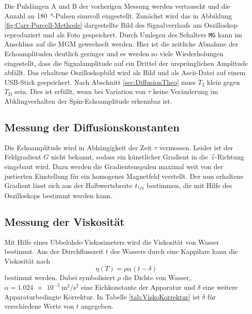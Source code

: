 Die Pulslängen A und B der vorherigen Messung werden vertauscht und die Anzahl an
\SI{180}{\degree}-Pulsen sinnvoll eingestellt.
Zunächst wird das in Abbildung \ref{fig:Carr-Purcell-Methode} dargestellte
Bild des Signalverrlaufs am Oszilloskop reproduziert und als Foto gespeichert.
Durch Umlegen des Schalters \texttt{MG} kann im Anschluss auf die MGM gewechselt werden.
Hier ist die zeitliche Abnahme der Echoamplituden deutlich geringer und es
werden so viele Wiederholungen eingestellt, dass die Signalamplitude auf ein Drittel
der ursprünglichen Amplitude abfällt.
Das erhaltene Oszilloskopbild wird als Bild und als Ascii-Datei auf einem USB-Stick
gespeichert.
Nach Abschnitt \ref{sec:DiffusionTheo} muss $T_2$ klein gegen $T_\text{D}$ sein.
Dies ist erfüllt, wenn bei Variation von $\tau$ keine Veränderung im Abklingverhalten
der Spin-Echoamplitude erkennbar ist.


\subsection{Messung der Diffusionskonstanten}
\label{sec:DurchDiffusion}

Die Echoamplitude wird in Abhängigkeit der Zeit $\tau$ vermessen.
Leider ist der Feldgradient $G$ nicht bekannt, sodass ein künstlicher Gradient
in die $\vec{z}$-Richtung eingebaut wird. Dazu werden die Gradientenspulen maximal
weit von der justierten Einstellung für ein homogenes Magnetfeld verstellt.
Der nun erhaltene Gradient lässt sich aus der Halbwertsbreite $t_{\sfrac{1}{2}}$
bestimmen, die mit Hilfe des Oszilloskops bestimmt werden kann.


\subsection{Messung der Viskosität}
\label{sec:DurchVisko}

Mit Hilfe eines Ubbelohde-Viskosimeters wird die Viskosität von Wasser bestimmt.
Aus der Durchflusszeit $t$ des Wassers durch eine Kappilare kann die
Viskosität nach
\begin{equation}
  \eta\!\left(T\right) = \rho \alpha \left(t - \delta\right)
  \label{eqn:Viskositaet}
\end{equation}
bestimmt werden.
Dabei symbolisiert $\rho$ die Dichte von Wasser,
$\alpha = \SI{1.024e-5}{\meter\squared\per\second\squared}$ eine Eichkonstante
der Apparatur und $\delta$ eine weitere Apparaturbedingte Korrektur.
In Tabelle \ref{tab:ViskoKorrektur} ist $\delta$ für verschiedene Werte
von $t$ angegeben.

